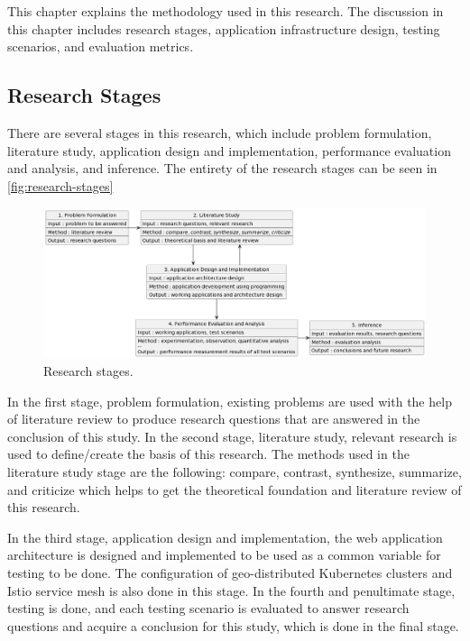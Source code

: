 \chapter{\babTiga}
\label{bab:3}
This chapter explains the methodology used in this research. The discussion in this chapter includes research stages, application infrastructure design, testing scenarios, and evaluation metrics.

\section{Research Stages}
\label{sec:researchStages}
There are several stages in this research, which include problem formulation, literature study, application design and implementation, performance evaluation and analysis, and inference. The entirety of the research stages can be seen in \autoref{fig:research-stages}
\begin{figure}
	\centering
	\includegraphics[width=1\textwidth]{assets/diagrams/research-stages.png}
	\caption{Research stages.}
	\label{fig:research-stages}
\end{figure}

In the first stage, problem formulation, existing problems are used with the help of literature review to produce research questions that are answered in the conclusion of this study. In the second stage, literature study, relevant research is used to define/create the basis of this research. The methods used in the literature study stage are the following: compare, contrast, synthesize, summarize, and criticize which helps to get the theoretical foundation and literature review of this research.

In the third stage, application design and implementation, the web application architecture is designed and implemented to be used as a common variable for testing to be done. The configuration of geo-distributed Kubernetes clusters and Istio service mesh is also done in this stage. In the fourth and penultimate stage, testing is done, and each testing scenario is evaluated to answer research questions and acquire a conclusion for this study, which is done in the final stage.

